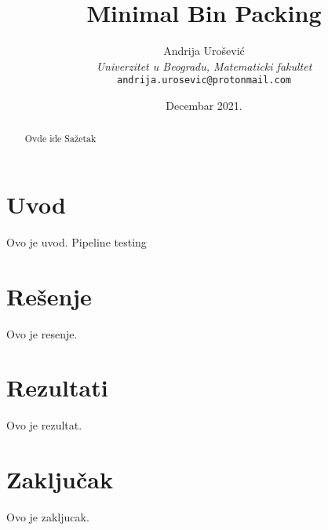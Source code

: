 \documentclass[a4paper,12pt]{article}
\title{Minimal Bin Packing}
\author{Andrija Urošević\\\textit{Univerzitet u Beogradu, Matematicki fakultet}\\\texttt{andrija.urosevic@protonmail.com}}
\date{Decembar 2021.}
\begin{document}
\maketitle

\begin{abstract}
    Ovde ide Sažetak
\end{abstract}

\begin{multicols}{2}

\section{Uvod}



Ovo je uvod.\cite{test}
Pipeline testing

\section{Rešenje}

Ovo je resenje.

\section{Rezultati}

Ovo je rezultat.

\section{Zaključak}

Ovo je zakljucak.

\printbibliography[title={Literatura}]

\end{multicols}
\end{document}
